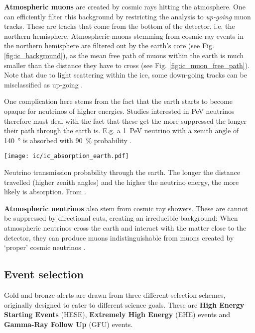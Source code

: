 \textbf{Atmospheric muons} are created by cosmic rays hitting the atmosphere. One can efficiently filter this background by restricting the analysis to \textit{up-going} muon tracks. These are tracks that come from the bottom of the detector, i.e. the northern hemisphere. Atmospheric muons stemming from cosmic ray events in the northern hemisphere are filtered out by the earth's core (see Fig. \ref{fig:ic_background}), as the mean free path of muons within the earth is much smaller  than the distance they have to cross (see Fig. \ref{fig:ic_muon_free_path}). Note that due to light scattering within the ice, some down-going tracks can be misclassified as up-going .

One complication here stems from the fact that the earth starts to become opaque for neutrinos of higher energies. Studies interested in \si{\peta\eV} neutrinos therefore must deal with the fact that these get the more suppressed the longer their path through the earth is. E.g. a \SI{1}{\peta\eV} neutrino with a zenith angle of \SI{140}{\degree} is absorbed with \SI{90}{\percent} probability .

\begin{marginfigure}
    \texttt{[image: ic/ic\_absorption\_earth.pdf]}
    \caption[Neutrino absorption in the earth]{Neutrino transmission probability through the earth. The longer the distance travelled (higher zenith angles) and the higher the neutrino energy, the more likely is absorption. From \cite{Aartsen2017c}.}
\end{marginfigure}

\textbf{Atmospheric neutrinos} also stem from cosmic ray showers. These are cannot be suppressed by directional cuts, creating an irreducible background: When atmospheric neutrinos cross the earth and interact with the matter close to the detector, they can produce muons indistinguishable from muons created by `proper' cosmic neutrinos \cite{Ahlers2018a}.

\subsection{Event selection} \label{ic_event_selection}
Gold and bronze alerts are drawn from three different selection schemes, originally designed to cater to different science goals. These are \textbf{High Energy Starting Events} (HESE), \textbf{Extremely High Energy} (EHE) events and \textbf{Gamma-Ray Follow Up} (GFU) events.

